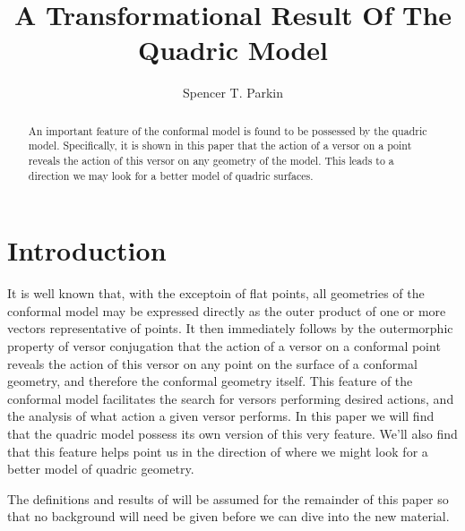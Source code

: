 \documentclass{birkjour}
\theoremstyle{definition}
\theoremstyle{remark}
\numberwithin{equation}{section}
\begin{document}
\title{A Transformational Result Of The Quadric Model}

\author{Spencer T. Parkin}
\address{%
2113 S. Claremont Dr.\\
Bountiful, Utah  84010\\
USA}





\begin{abstract}
An important feature of the conformal model is found
to be possessed by the quadric model.  Specifically, it is
shown in this paper that the action of a versor on a point
reveals the action of this versor on any geometry of the model.
This leads to a direction we may look for a better model of quadric surfaces.
\end{abstract}

\maketitle

\section{Introduction}

It is well known that, with the exceptoin of flat points, all geometries of
the conformal model may be expressed directly as the outer product
of one or more vectors representative of points.  It then immediately
follows by the outermorphic property of versor conjugation that the
action of a versor on a conformal point reveals the action of this versor
on any point on the surface of a conformal geometry, and therefore
the conformal geometry itself.  This feature of the conformal model
facilitates the search for versors performing desired actions, and the
analysis of what action a given versor performs.  In this paper we
will find that the quadric model possess its own version of this very feature.
We'll also find that this feature helps point us in the direction of where
we might look for a better model of quadric geometry.

The definitions and results of \cite{Parkin12} will be assumed for
the remainder of this paper so that no background will need be
given before we can dive into the new material.
\end{document}
